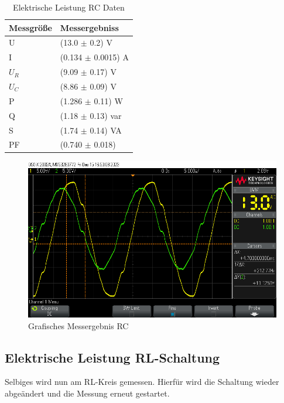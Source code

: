 \documentclass[12pt,a4paper,twoside]{article}
\begin{document}
\begin{table}[H]
    \centering
    \caption{Elektrische Leistung RC Daten}
    \label{tab:Daten5}
    \begin{tabular}{| l | l |}
        \hline
        Messgröße & Messergebniss \\
        \hline
        U & (13.0 $\pm$ 0.2) V \\
        I & (0.134 $\pm$ 0.0015) A \\
        $U_{R}$ & (9.09 $\pm$ 0.17) V \\
        $U_{C}$ & (8.86 $\pm$ 0.09) V \\
        P & (1.286 $\pm$ 0.11) W \\
        Q & (1.18 $\pm$ 0.13) var \\
        S & (1.74 $\pm$ 0.14) VA \\
        PF & (0.740 $\pm$ 0.018) \\
        \hline
    \end{tabular}
\end{table}

\begin{figure}[H]
    \centering
    \includegraphics[width=0.6\linewidth]{nudes/PhaseLeistung/Aufgabe5/scope_7.png}
    \caption{Grafisches Messergebnis RC}
    \label{fig:MessergebnisGrafischRC}
\end{figure}


\subsection{Elektrische Leistung RL-Schaltung}

Selbiges wird nun am RL-Kreis gemessen. Hierfür wird die Schaltung wieder abgeändert und die Messung erneut gestartet.
\end{document}
